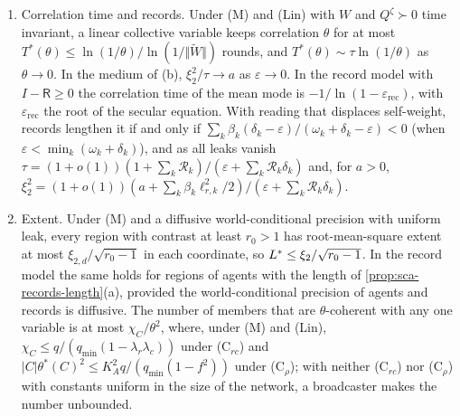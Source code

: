 \begin{theorem}
\begin{enumerate}
\item[(d)] Correlation time and records. Under \textup{(M)} and \textup{(Lin)} with $W$ and $Q^\zeta\succ0$ time invariant, a linear collective variable keeps correlation $\theta$ for at most $T^\ast(\theta)\le\ln(1/\theta)/\ln(1/\Vert\tilde W\Vert)$ rounds, and $T^\ast(\theta)\sim\tau\ln(1/\theta)$ as $\theta\to0$. In the medium of (b), $\xi_2^2/\tau\to a$ as $\varepsilon\to0$. In the record model with $I-\mathsf R\ge0$ the correlation time of the mean mode is $-1/\ln(1-\varepsilon_{\mathrm{rec}})$, with $\varepsilon_{\mathrm{rec}}$ the root of the secular equation. With reading that displaces self-weight, records lengthen it if and only if $\sum_k\beta_k(\delta_k-\varepsilon)/(\omega_k+\delta_k-\varepsilon)<0$ (when $\varepsilon<\min_k(\omega_k+\delta_k)$), and as all leaks vanish $\tau=(1+o(1))(1+\sum_k\mathcal R_k)/(\varepsilon+\sum_k\mathcal R_k\delta_k)$ and, for $a>0$, $\xi_2^2=(1+o(1))(a+\sum_k\beta_k\ell_{r,k}^2/2)/(\varepsilon+\sum_k\mathcal R_k\delta_k)$.
\item[(e)] Extent. Under \textup{(M)} and a diffusive world-conditional precision with uniform leak, every region with contrast at least $r_0>1$ has root-mean-square extent at most $\xi_{2,d}/\sqrt{r_0-1}$ in each coordinate, so $L^{\ast}\le\xi_2/\sqrt{r_0-1}$. In the record model the same holds for regions of agents with the length of \cref{prop:sca-records-length}(a), provided the world-conditional precision of agents and records is diffusive. The number of members that are $\theta$-coherent with any one variable is at most $\chi_C/\theta^2$, where, under \textup{(M)} and \textup{(Lin)}, $\chi_C\le q/(q_{\min}(1-\lambda_r\lambda_c))$ under \textup{(C$_{rc}$)} and $|C|\theta^\ast(C)^2\le K_A^2q/(q_{\min}(1-f^2))$ under \textup{(C$_\rho$)}; with neither \textup{(C$_{rc}$)} nor \textup{(C$_\rho$)} with constants uniform in the size of the network, a broadcaster makes the number unbounded.
\end{enumerate}
\end{theorem}
